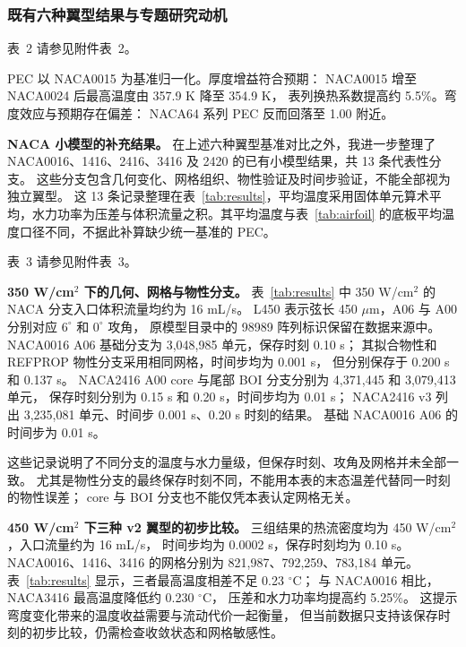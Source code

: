 \documentclass[stage2,fontset=fandol]{ydzjreport}
\makeatletter
\newcommand{\submissionnumber}[1]{\def\@currentlabel{#1}}
\makeatother
\begin{document}
\subsubsection{既有六种翼型结果与专题研究动机}


\par\noindent \begingroup\submissionnumber{2}\label{tab:airfoil}\endgroup 表~2 请参见附件表~2。\par


PEC 以 NACA0015 为基准归一化。厚度增益符合预期：
NACA0015 增至 NACA0024 后最高温度由 357.9 K 降至 354.9 K，
表列换热系数提高约 5.5\%。弯度效应与预期存在偏差：
NACA64 系列 PEC 反而回落至 1.00 附近。


\textbf{NACA 小模型的补充结果。}
在上述六种翼型基准对比之外，我进一步整理了 NACA0016、1416、2416、3416
及 2420 的已有小模型结果，共 13 条代表性分支。
这些分支包含几何变化、网格组织、物性验证及时间步验证，不能全部视为独立翼型。
这 13 条记录整理在表~\ref{tab:results}，平均温度采用固体单元算术平均，水力功率为压差与体积流量之积。其平均温度与表~\ref{tab:airfoil} 的底板平均温度口径不同，不据此补算缺少统一基准的 PEC。

\begingroup
\small
\renewcommand{\arraystretch}{1.05}
\setlength{\tabcolsep}{4pt}
\setlength{\LTleft}{0pt}
\setlength{\LTright}{0pt plus 1fill}

\par\noindent \begingroup\submissionnumber{3}\label{tab:results}\endgroup 表~3 请参见附件表~3。\par


\endgroup

\textbf{350 W/cm$^2$ 下的几何、网格与物性分支。}
表~\ref{tab:results} 中 350 W/cm$^2$ 的 NACA 分支入口体积流量均约为 16 mL/s。
L450 表示弦长 450 $\mu$m，A06 与 A00 分别对应 $6^\circ$ 和 $0^\circ$ 攻角，
原模型目录中的 98989 阵列标识保留在数据来源中。
NACA0016 A06 基础分支为 3,048,985 单元，保存时刻 0.10 s；
其拟合物性和 REFPROP 物性分支采用相同网格，时间步均为 0.001 s，
但分别保存于 0.200 s 和 0.137 s。
NACA2416 A00 core 与尾部 BOI 分支分别为 4,371,445 和 3,079,413 单元，
保存时刻分别为 0.15 s 和 0.20 s，时间步均为 0.01 s；
NACA2416 v3 列出 3,235,081 单元、时间步 0.001 s、0.20 s 时刻的结果。
基础 NACA0016 A06 的时间步为 0.01 s。


这些记录说明了不同分支的温度与水力量级，但保存时刻、攻角及网格并未全部一致。
尤其是物性分支的最终保存时刻不同，不能用本表的末态温差代替同一时刻的物性误差；
core 与 BOI 分支也不能仅凭本表认定网格无关。

\textbf{450 W/cm$^2$ 下三种 v2 翼型的初步比较。}
三组结果的热流密度均为 450 W/cm$^2$，入口流量约为 16 mL/s，
时间步均为 0.0002 s，保存时刻均为 0.10 s。
NACA0016、1416、3416 的网格分别为 821,987、792,259、783,184 单元。
表~\ref{tab:results} 显示，三者最高温度相差不足 0.23 $^\circ$C；
与 NACA0016 相比，NACA3416 最高温度降低约 0.230 $^\circ$C，
压差和水力功率均提高约 5.25\%。
这提示弯度变化带来的温度收益需要与流动代价一起衡量，
但当前数据只支持该保存时刻的初步比较，仍需检查收敛状态和网格敏感性。
\end{document}
